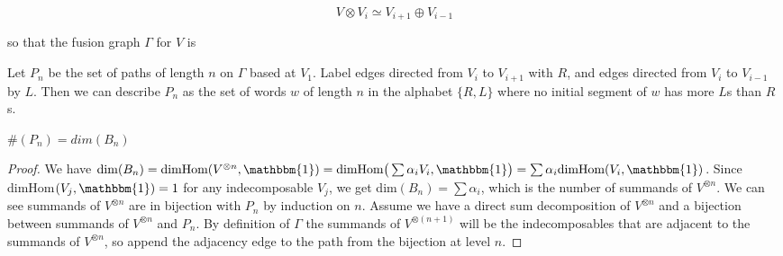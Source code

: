 \documentclass[11pt]{article} %
\begin{document}
\begin{equation} \label{eq1}
V \otimes V_i \simeq V_{i+1} \oplus V_{i-1}
\end{equation}

so that the fusion graph $\Gamma$ for $V$ is


\begin{mydef}
Let $P_n$ be the set of paths of length $n$ on $\Gamma$ based at $V_1$. Label edges directed from $V_i$ to $V_{i+1}$ with $R$, and edges directed from $V_{i}$ to $V_{i-1}$ by $L$. Then we can describe $P_n$ as the set of words $w$ of length $n$ in the alphabet $\{R,L\}$ where no initial segment of $w$ has more $L$s than $R$s.
\end{mydef}

\begin{prop}
$\#(P_n)=dim(B_n)$
\end{prop}

\begin{proof}
  We have $\dim(B_n)=\text{dimHom}(V^{\otimes n},\mathbbm{1})=\text{dimHom} \big( \sum{\alpha_i V_i,\mathbbm{1} \big) }=\sum{\alpha_i \text{dimHom}(V_i,\mathbbm{1})}$. Since dimHom$(V_j, \mathbbm{1}) = 1$ for any indecomposable $V_j$, we get dim$(B_n)=\sum{\alpha_i}$, which is the number of summands of $V^{\otimes n}$. We can see summands of $V^{\otimes n}$ are in bijection with $P_n$ by induction on $n$. Assume we have a direct sum decomposition of $V^{\otimes n}$ and a bijection between summands of $V^{\otimes n}$ and $P_n$. By definition of $\Gamma$ the summands of $V^{\otimes (n+1)}$ will be the indecomposables that are adjacent to the summands of $V^{\otimes n}$, so append the adjacency edge to the path from the bijection at level $n$.
\end{proof}
\end{document}
